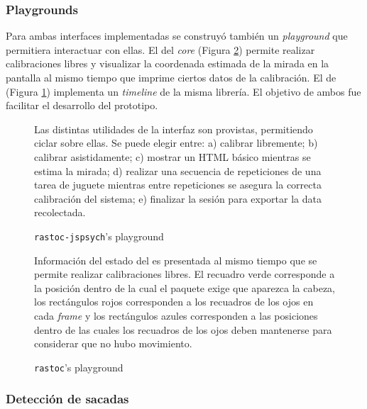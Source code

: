 \subsubsection{Playgrounds}

Para ambas interfaces implementadas se construyó también un \textit{playground}
que permitiera interactuar con ellas.
El del \textit{core} (Figura \ref{fig:rastoc-playground}) permite realizar
calibraciones libres y visualizar la coordenada estimada de la mirada en la
pantalla al mismo tiempo que imprime ciertos datos de la calibración.
El de \jspsych (Figura \ref{fig:rastoc-jspsych-playground}) implementa un
\textit{timeline} de la misma librería.
El objetivo de ambos fue facilitar el desarrollo del prototipo.

\begin{figure}
    \centering
    \caption{\texttt{rastoc-jspsych}’s playground}
    Las distintas utilidades de la interfaz \jspsych son provistas, permitiendo
    ciclar sobre ellas.
    Se puede elegir entre:
    a) calibrar libremente;
    b) calibrar asistidamente;
    c) mostrar un HTML básico mientras se estima la mirada;
    d) realizar una secuencia de repeticiones de una tarea de juguete mientras
    entre repeticiones se asegura la correcta calibración del sistema;
    e) finalizar la sesión para exportar la data recolectada.
    \label{fig:rastoc-jspsych-playground}
\end{figure}

\begin{figure}
    \centering
    \caption{\texttt{rastoc}’s playground}
    Información del estado del \eyetracker es presentada al mismo tiempo que se
    permite realizar calibraciones libres.
    El recuadro verde corresponde a la posición dentro de la cual el paquete
    \webgazer exige que aparezca la cabeza, los rectángulos rojos corresponden
    a los recuadros de los ojos en cada \textit{frame} y los rectángulos azules
    corresponden a las posiciones dentro de las cuales los recuadros de los
    ojos deben mantenerse para considerar que no hubo movimiento.
    \label{fig:rastoc-playground}
\end{figure}

\subsubsection{Detección de sacadas}

